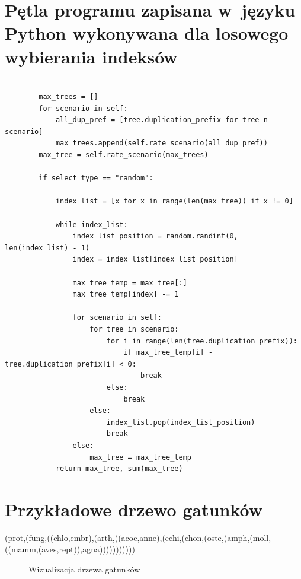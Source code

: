 \documentclass[licencjacka]{pracamgr}
\begin{document}
\appendix

\chapter{Pętla programu zapisana w~języku Python wykonywana dla losowego wybierania indeksów}

\begin{verbatim}

		max_trees = []
        for scenario in self:
            all_dup_pref = [tree.duplication_prefix for tree n scenario]
            max_trees.append(self.rate_scenario(all_dup_pref))
        max_tree = self.rate_scenario(max_trees)

        if select_type == "random":

            index_list = [x for x in range(len(max_tree)) if x != 0]

            while index_list:
                index_list_position = random.randint(0, len(index_list) - 1)
                index = index_list[index_list_position]

                max_tree_temp = max_tree[:]
                max_tree_temp[index] -= 1

                for scenario in self:
                    for tree in scenario:
                        for i in range(len(tree.duplication_prefix)):
                            if max_tree_temp[i] - tree.duplication_prefix[i] < 0:
                                break
                        else:
                            break
                    else:
                        index_list.pop(index_list_position)
                        break
                else:
                    max_tree = max_tree_temp
            return max_tree, sum(max_tree)
\end{verbatim}

\chapter{Przykładowe drzewo gatunków}

\begin{center}
(prot,(fung,((chlo,embr),(arth,((acoe,anne),(echi,(chon,(oste,(amph,(moll,((mamm,(aves,rept)),agna)))))))))))
\end{center}

\begin{figure}[tp]
  \centering
  \caption{Wizualizacja drzewa gatunków}
\end{figure}
\end{document}
